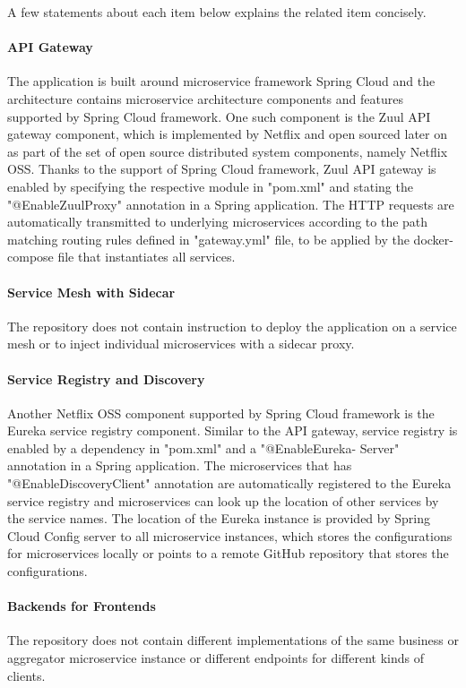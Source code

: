 \documentclass{Configuration_Files/PoliMi3i_thesis}
\begin{document}
A few statements about each item below explains the related item concisely.

    \paragraph{API Gateway} The application is built around microservice framework Spring Cloud and the architecture contains microservice architecture components and features supported by Spring Cloud framework. 
    One such component is the Zuul API gateway component, which is implemented by Netflix and open sourced later on as part of the set of open source distributed system components, namely  Netflix OSS.
    Thanks to the support of Spring Cloud framework, Zuul API gateway is enabled by specifying the respective module in "pom.xml" and stating the "@EnableZuulProxy" annotation in a Spring application.
    The HTTP requests are automatically transmitted to underlying microservices according to the path matching routing rules defined in "gateway.yml" file, to be applied by the docker-compose file that instantiates all services.
    
    \paragraph{Service Mesh with Sidecar} The repository does not contain instruction to deploy the application on a service mesh or to inject individual microservices with a sidecar proxy.
    
    \paragraph{Service Registry and Discovery} Another Netflix OSS component supported by Spring Cloud framework is the Eureka service registry component.
    Similar to the API gateway, service registry is enabled by a dependency in "pom.xml" and a "@EnableEureka- Server" annotation in a Spring application.
    The microservices that has "@EnableDiscoveryClient" annotation are automatically registered to the Eureka service registry and microservices can look up the location of other services by the service names.
    The location of the Eureka instance is provided by Spring Cloud Config server to all microservice instances, which stores the configurations for microservices locally or points to a remote GitHub repository that stores the configurations.
    
    \paragraph{Backends for Frontends} The repository does not contain different implementations of the same business or aggregator microservice instance or different endpoints for different kinds of clients.
    
\end{document}
